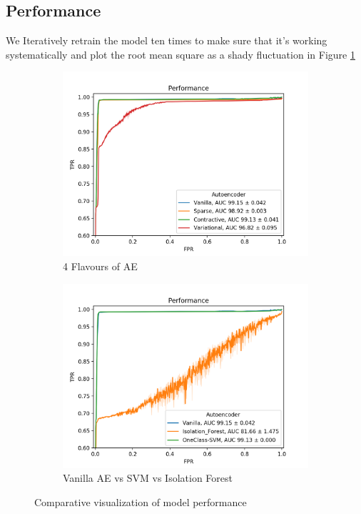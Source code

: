 \subsection{Performance}
We Iteratively retrain the model ten times to make sure that it's working systematically and plot the root mean square as a shady fluctuation in Figure \ref{fig:performance_2016}
\begin{figure}[h!]
\centering
    \begin{subfigure}[b]{0.49\linewidth}
        \includegraphics[width=\linewidth]{images/reco/2016/performance.png}
        \caption{4 Flavours of AE}
    \end{subfigure}
    \begin{subfigure}[b]{0.49\linewidth}
        \includegraphics[width=\linewidth]{images/reco/2016/performance_ml.png}
        \caption{Vanilla AE vs SVM vs Isolation Forest}
    \end{subfigure}
\caption{Comparative visualization of model performance}
\label{fig:performance_2016}
\end{figure}

